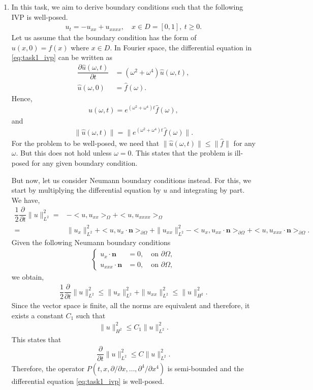 \documentclass[10pt,a4paper,twoside, french]{article}
\numberwithin{equation}{section}
\numberwithin{figure}{section}
\numberwithin{table}{section}
\newcommand{\bn}{\mathbf{n}}
\begin{document}
\setcounter{section}{1}
\begin{enumerate}
\item In this task, we aim to derive boundary conditions such that the following IVP is well-posed.
\begin{align}
u_t=-u_{xx}+u_{xxxx},\quad x\in D=[0,1],~t\geq0.
\label{eq:task1_ivp}
\end{align}
Let us assume that the boundary condition has the form of $u(x,0)=f(x)$ where $x\in D$. In Fourier space, the differential equation in \eqref{eq:task1_ivp} can be written as
\begin{align}
\dfrac{\partial \hat{u}(\omega,t)}{\partial t} &= (\omega^2+\omega^4) \hat{u}(\omega,t),\\
\hat{u}(\omega,0) &= \hat{f}(\omega).
\end{align}
Hence,
\begin{align}
\hat{u}(\omega,t) = e^{(\omega^2+\omega^4)t}\hat{f}(\omega),
\end{align}
and
\begin{align}
\|\hat{u}(\omega,t)\| = \|e^{(\omega^2+\omega^4)t}\hat{f}(\omega)\|.
\end{align}
For the problem to be well-posed, we need that $\|\hat{u}(\omega,t)\|\leq \|\hat{f}\|$ for any $\omega$. But this does not hold unless $\omega=0$. This states that the problem is ill-posed for any given boundary condition.

But now, let us consider Neumann boundary conditions instead. For this, we start by multiplying the differential equation by $u$ and integrating by part. We have,
\begin{align}
\dfrac{1}{2}\dfrac{\partial}{\partial t}\|u\|^2_{L^2} =& -<u,u_{xx}>_{\Omega} + <u,u_{xxxx}>_{\Omega} \nonumber \\
=&\|u_x\|^2_{L^2} + <u,u_{x}\cdot\bn>_{\partial\Omega} + \|u_{xx}\|^2_{L^2} - <u_x,u_{xx}\cdot\bn>_{\partial\Omega}+<u,u_{xxx}\cdot\bn>_{\partial\Omega}.
\end{align}
Given the following Neumann boundary conditions 
\begin{align}
\left\lbrace
\begin{array}{cc}
u_x\cdot\bn &= 0, \quad \text{on } \partial\Omega,\\
u_{xxx}\cdot\bn &= 0, \quad \text{on } \partial\Omega,
\end{array}\right.
\end{align}
we obtain,
\begin{align}
\dfrac{1}{2}\dfrac{\partial}{\partial t}\|u\|^2_{L^2} \leq \|u_{x}\|^2_{L^2} + \|u_{xx}\|^2_{L^2} \leq \|u\|^2_{H^2}.
\end{align}
Since the vector space is finite, all the norms are equivalent and therefore, it exists a constant $C_1$ such that 
\begin{align*}
\|u\|^2_{H^2}\leq C_1\|u\|^2_{L^2}.
\end{align*}
This states that
\begin{align}
\dfrac{\partial}{\partial t}\|u\|^2_{L^2} \leq C \|u\|^2_{L^2}.
\end{align}
Therefore, the operator $P(t,x,\partial/\partial x,\ldots,\partial^4/\partial x^4)$ is semi-bounded and the differential equation \eqref{eq:task1_ivp} is well-posed. 


\end{enumerate}
\end{document}
